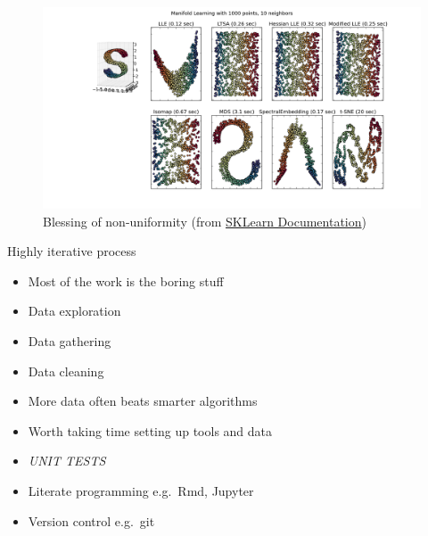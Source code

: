 \documentclass[ignorenonframetext,]{beamer}
\begin{document}
\begin{frame}

\begin{figure}[htbp]
\centering
\includegraphics{assets/presentation/GIML/manifold.png}
\caption{Blessing of non-uniformity (from
\href{http://scikit-learn.org/stable/auto_examples/manifold/plot_compare_methods.html}{SKLearn
Documentation})}
\end{figure}

\end{frame}

\begin{frame}{Highly iterative process}

\begin{itemize}
\itemsep1pt\parskip0pt
\item
  Most of the work is the boring stuff
\item
  Data exploration
\item
  Data gathering
\item
  Data cleaning
\item
  More data often beats smarter algorithms
\end{itemize}

\end{frame}

\begin{frame}

\begin{itemize}
\itemsep1pt\parskip0pt
\item
  Worth taking time setting up tools and data
\item
  \emph{UNIT TESTS}
\item
  Literate programming e.g.~Rmd, Jupyter
\item
  Version control e.g.~git
\end{itemize}

\end{frame}
\end{document}
